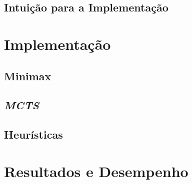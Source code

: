 \documentclass[12pt,a4paper,oneside]{article}
\begin{document}
\lipsum[2]

\subsection{Intuição para a Implementação}

\lipsum[1]

\lipsum[2]


\section{Implementação}
\label{sec:imp}

\lipsum[1]

\subsection{Minimax}

\lipsum[1]

\lipsum[2]

\subsection{\textit{MCTS}}

\lipsum[1]

\lipsum[2]

\lipsum[3]

\subsection{Heurísticas}

\lipsum[1]

\lipsum[2]

\lipsum[3]


\section{Resultados e Desempenho}
\label{sec:resdes}

\lipsum[1]

\lipsum[2]
\end{document}
